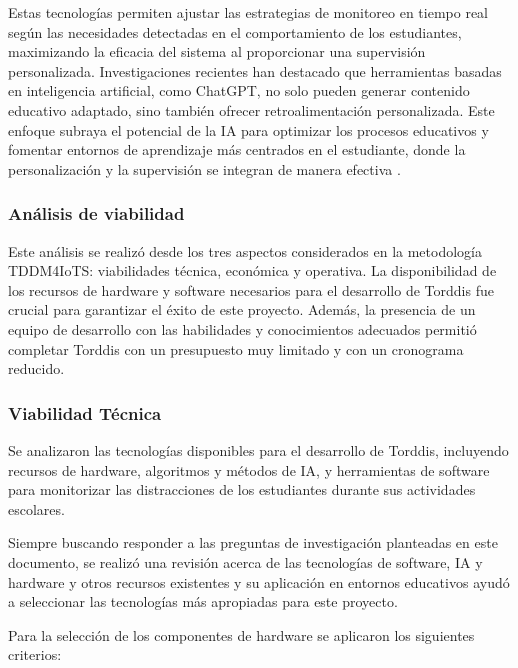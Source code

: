 \documentclass[a4paper,fleqn]{cas-sc}
\begin{document}
				Estas tecnologías permiten ajustar las estrategias de monitoreo en tiempo real según las necesidades detectadas en el comportamiento de los estudiantes, maximizando la eficacia del sistema al proporcionar una supervisión personalizada. Investigaciones recientes han destacado que herramientas basadas en inteligencia artificial, como ChatGPT, no solo pueden generar contenido educativo adaptado, sino también ofrecer retroalimentación personalizada. Este enfoque subraya el potencial de la IA para optimizar los procesos educativos y fomentar entornos de aprendizaje más centrados en el estudiante, donde la personalización y la supervisión se integran de manera efectiva \cite{Wang2025Development, Li2024Systematic}.
			
			\subsubsection{Análisis de viabilidad}
				Este análisis se realizó desde los tres aspectos considerados en la metodología TDDM4IoTS: viabilidades técnica, económica y operativa. La disponibilidad de los recursos de hardware y software necesarios para el desarrollo de Torddis fue crucial para garantizar el éxito de este proyecto. Además, la presencia de un equipo de desarrollo con las habilidades y conocimientos adecuados permitió completar Torddis con un presupuesto muy limitado y con un cronograma reducido.
			
			\subsubsection{Viabilidad Técnica}
				Se analizaron las tecnologías disponibles para el desarrollo de Torddis, incluyendo recursos de hardware, algoritmos y métodos de IA, y herramientas de software para monitorizar las distracciones de los estudiantes durante sus actividades escolares.
				
				Siempre buscando responder a las preguntas de investigación planteadas en este documento, se realizó una revisión acerca de las tecnologías de software, IA y hardware y otros recursos existentes y su aplicación en entornos educativos ayudó a seleccionar las tecnologías más apropiadas para este proyecto.
				
				Para la selección de los componentes de hardware se aplicaron los siguientes criterios:
				
\end{document}
